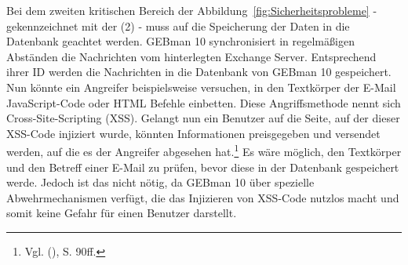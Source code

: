 \noindent
Bei dem zweiten kritischen Bereich der Abbildung~\ref{fig:Sicherheitsprobleme} - gekennzeichnet mit der (2) - muss auf die Speicherung der Daten in die Datenbank geachtet werden. GEBman 10 synchronisiert in regelmäßigen Abständen die Nachrichten vom hinterlegten Exchange Server. Entsprechend ihrer ID werden die Nachrichten in die Datenbank von GEBman 10 gespeichert. Nun könnte ein Angreifer beispielsweise versuchen, in den Textkörper der E-Mail JavaScript-Code oder HTML Befehle einbetten. Diese Angriffsmethode nennt sich Cross-Site-Scripting (XSS). Gelangt nun ein Benutzer auf die Seite, auf der dieser XSS-Code injiziert wurde, könnten Informationen preisgegeben und versendet werden, auf die es der Angreifer abgesehen hat.\footnote{Vgl. \citeauthor{Rohr} (\citeyear{Rohr}), S. 90ff.}\newline
Es wäre möglich, den Textkörper und den Betreff einer E-Mail zu prüfen, bevor diese in der Datenbank gespeichert werde. Jedoch ist das nicht nötig, da GEBman 10 über spezielle Abwehrmechanismen verfügt, die das Injizieren von XSS-Code nutzlos macht und somit keine Gefahr für einen Benutzer darstellt.

 

